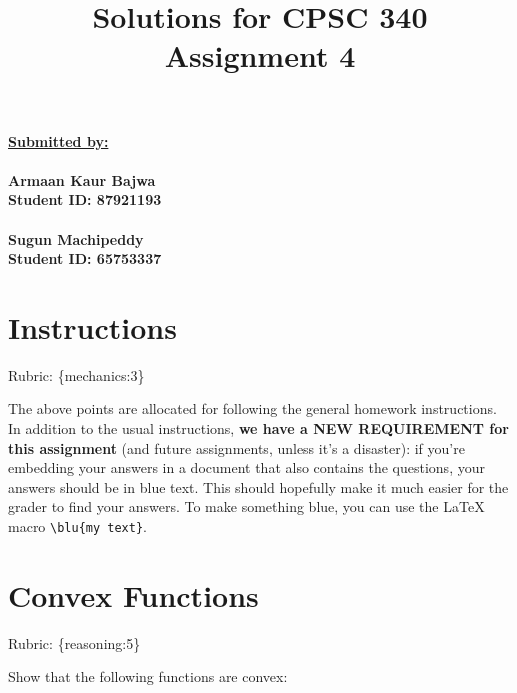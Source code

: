 \documentclass{article}
\def\rubric#1{\gre{Rubric: \{#1\}}}{}
\def\blu#1{{\color{blu}#1}}
\def\gre#1{{\color{gre}#1}}
\begin{document}
\title{Solutions for CPSC 340 Assignment 4}
\date{}
\maketitle


\underline{\textbf{Submitted by:}}\\ \\
 \textbf{Armaan Kaur Bajwa\\
 Student ID: 87921193\\ \\
 Sugun Machipeddy\\
 Student ID: 65753337} 

\vspace{1em}

\section*{Instructions}
\rubric{mechanics:3}

The above points are allocated for following the general homework instructions. In addition to the usual instructions,
\textbf{we have a NEW REQUIREMENT for this assignment} (and future assignments, unless it's a disaster):
if you're embedding your answers in a document that also contains the questions,
your answers should be in \blu{blue text}. This should hopefully make it much easier for the grader to find
your answers. To make something blue, you can use the LaTeX macro \verb|\blu{my text}|.


\section{Convex Functions}
\rubric{reasoning:5}


Show that the following functions are convex:
\end{document}
